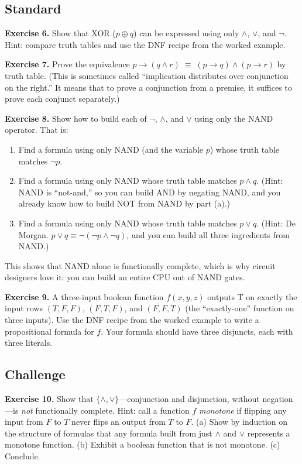 \documentclass[11pt]{article}
\begin{document}
\subsection*{Standard}

\textbf{Exercise 6.}\label{ex:m2:6} Show that XOR ($p \oplus q$) can be expressed using only $\wedge$, $\vee$, and $\lnot$. Hint: compare truth tables and use the DNF recipe from the worked example.

\bigskip
\textbf{Exercise 7.}\label{ex:m2:7} Prove the equivalence $p \to (q \wedge r) \;\equiv\; (p \to q) \wedge (p \to r)$ by truth table. (This is sometimes called ``implication distributes over conjunction on the right.'' It means that to prove a conjunction from a premise, it suffices to prove each conjunct separately.)

\bigskip
\textbf{Exercise 8.}\label{ex:m2:8} Show how to build each of $\lnot$, $\wedge$, and $\vee$ using only the NAND operator. That is:
\begin{enumerate}[label=(\alph*)]
  \item Find a formula using only NAND (and the variable $p$) whose truth table matches $\lnot p$.
  \item Find a formula using only NAND whose truth table matches $p \wedge q$. (Hint: NAND is ``not-and,'' so you can build AND by negating NAND, and you already know how to build NOT from NAND by part (a).)
  \item Find a formula using only NAND whose truth table matches $p \vee q$. (Hint: De Morgan. $p \vee q \equiv \lnot(\lnot p \wedge \lnot q)$, and you can build all three ingredients from NAND.)
\end{enumerate}
This shows that NAND alone is functionally complete, which is why circuit designers love it: you can build an entire CPU out of NAND gates.

\bigskip
\textbf{Exercise 9.}\label{ex:m2:9} A three-input boolean function $f(x, y, z)$ outputs T on exactly the input rows $(T, F, F)$, $(F, T, F)$, and $(F, F, T)$ (the ``exactly-one'' function on three inputs). Use the DNF recipe from the worked example to write a propositional formula for $f$. Your formula should have three disjuncts, each with three literals.

\subsection*{Challenge}

\textbf{Exercise 10.}\label{ex:m2:10} Show that $\{\wedge, \vee\}$---conjunction and disjunction, without negation---is \emph{not} functionally complete. Hint: call a function $f$ \emph{monotone} if flipping any input from $F$ to $T$ never flips an output from $T$ to $F$. (a) Show by induction on the structure of formulas that any formula built from just $\wedge$ and $\vee$ represents a monotone function. (b) Exhibit a boolean function that is not monotone. (c) Conclude.
\end{document}
